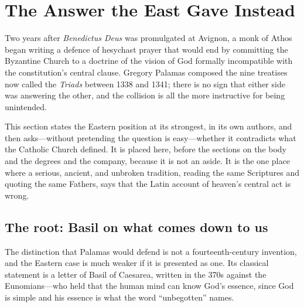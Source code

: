 \section{The Answer the East Gave Instead}

Two years after \emph{Benedictus Deus} was promulgated at Avignon, a monk of Athos began writing a defence of hesychast prayer that would end by committing the Byzantine Church to a doctrine of the vision of God formally incompatible with the constitution's central clause. Gregory Palamas composed the nine treatises now called the \emph{Triads} between 1338 and 1341; there is no sign that either side was answering the other, and the collision is all the more instructive for being unintended.

This section states the Eastern position at its strongest, in its own authors, and then asks---without pretending the question is easy---whether it contradicts what the Catholic Church defined. It is placed here, before the sections on the body and the degrees and the company, because it is not an aside. It is the one place where a serious, ancient, and unbroken tradition, reading the same Scriptures and quoting the same Fathers, says that the Latin account of heaven's central act is wrong.

\subsection{The root: Basil on what comes down to us}

The distinction that Palamas would defend is not a fourteenth-century invention, and the Eastern case is much weaker if it is presented as one. Its classical statement is a letter of Basil of Caesarea, written in the 370s against the Eunomians---who held that the human mind can know God's essence, since God is simple and his essence is what the word ``unbegotten'' names.

